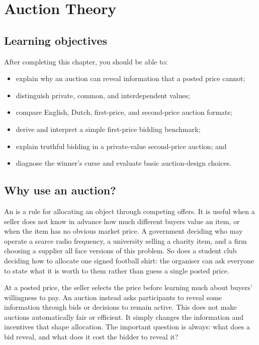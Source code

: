 \chapter{Auction Theory}
\label{chap:auctions}

\section{Learning objectives}

After completing this chapter, you should be able to:
\begin{itemize}
  \item explain why an auction can reveal information that a posted price cannot;
  \item distinguish private, common, and interdependent values;
  \item compare English, Dutch, first-price, and second-price auction formats;
  \item derive and interpret a simple first-price bidding benchmark;
  \item explain truthful bidding in a private-value second-price auction; and
  \item diagnose the winner's curse and evaluate basic auction-design choices.
\end{itemize}

\section{Why use an auction?}

An  is a rule for allocating an object through competing
offers. It is useful when a seller does not know in advance how much different
buyers value an item, or when the item has no obvious market price. A
government deciding who may operate a scarce radio frequency, a university
selling a charity item, and a firm choosing a supplier all face versions of
this problem. So does a student club deciding how to allocate one signed
football shirt: the organiser can ask everyone to state what it is worth to
them rather than guess a single posted price.

At a posted price, the seller selects the price before learning much about
buyers' willingness to pay. An auction instead asks participants to reveal
some information through bids or decisions to remain active. This does not
make auctions automatically fair or efficient. It simply changes the
information and incentives that shape allocation. The important question is
always: what does a bid reveal, and what does it cost the bidder to reveal it?

